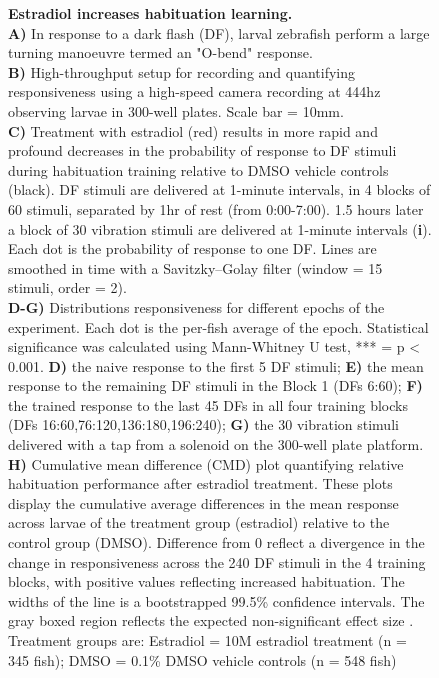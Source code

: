 \documentclass[9.5pt,lineno]{RandlettLab_elife}
\begin{document}
{\begin{figure}
\begin{center}
\caption{\textbf{Estradiol increases habituation learning.} \doublespacing
\\ \textbf{A)} In response to a dark flash (DF), larval zebrafish perform a large turning manoeuvre termed an "O-bend" response.
\\ \textbf{B)} High-throughput setup for recording and quantifying responsiveness using a high-speed camera recording at 444hz observing larvae in 300-well plates. Scale bar = 10mm.
\\ \textbf{C)} Treatment with estradiol (red) results in more rapid and profound decreases in the probability of response to DF stimuli during habituation training relative to DMSO vehicle controls (black). DF stimuli are delivered at 1-minute intervals, in 4 blocks of 60 stimuli, separated by 1hr of rest (from 0:00-7:00). 1.5 hours later a block of 30 vibration stimuli are delivered at 1-minute intervals (\textbf{i}). Each dot is the probability of response to one DF. Lines are smoothed in time with a Savitzky–Golay filter (window = 15 stimuli, order = 2). 
\\ \textbf{D-G)} Distributions responsiveness for different epochs of the experiment. Each dot is the per-fish average of the epoch. Statistical significance was calculated using Mann-Whitney U test, *** = p < 0.001.  \textbf{D)} the naive response to the first 5 DF stimuli; \textbf{E)} the mean response to the remaining DF stimuli in the Block 1 (DFs 6:60); \textbf{F)} the trained response to the last 45 DFs in all four training blocks (DFs 16:60,76:120,136:180,196:240); \textbf{G)} the 30 vibration stimuli delivered with a tap from a solenoid on the 300-well plate platform. 
\\ \textbf{H)} Cumulative mean difference (CMD) plot quantifying relative habituation performance after estradiol treatment. These plots display the cumulative average differences in the mean response across larvae of the treatment group (estradiol) relative to the control group (DMSO). Difference from 0 reflect a divergence in the change in responsiveness across the 240 DF stimuli in the 4 training blocks, with positive values reflecting increased habituation. The widths of the line is a bootstrapped 99.5\% confidence intervals. The gray boxed region reflects the expected non-significant effect size \citep{Randlett2019-fj}.
\\ Treatment groups are: Estradiol = 10\textmu M estradiol treatment (n = 345 fish); DMSO = 0.1\% DMSO vehicle controls (n = 548 fish)
}

\label{fig:1}


\end{center}
\end{figure}}
\end{document}
